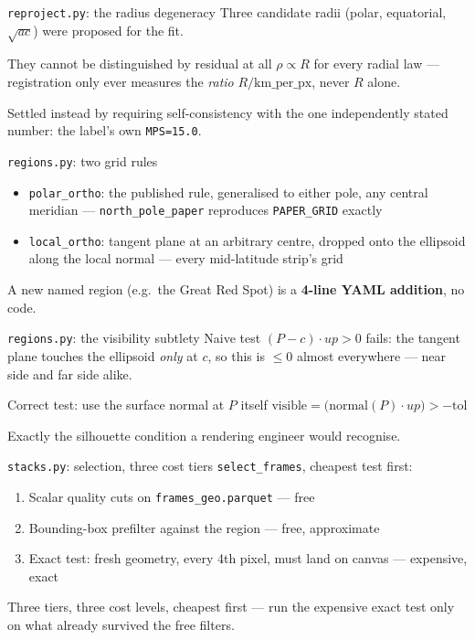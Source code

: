 \documentclass[aspectratio=169,11pt]{beamer}
\newcommand{\currevsec}{}
\newcommand{\revsec}[1]{\gdef\currevsec{#1}}
\begin{document}
\begin{frame}{\texttt{reproject.py}: the radius degeneracy}
  \revsec{4.8}
  Three candidate radii (polar, equatorial, $\sqrt{ac}$) were proposed for the fit.
  \begin{alertblock}{They cannot be distinguished by residual at all}
    $\rho \propto R$ for every radial law --- registration only ever measures the \emph{ratio} $R / \text{km\_per\_px}$, never $R$ alone.
  \end{alertblock}
  Settled instead by requiring self-consistency with the one independently stated number: the label's own \texttt{MPS=15.0}.
\end{frame}

\begin{frame}{\texttt{regions.py}: two grid rules}
  \revsec{4.9}
  \begin{itemize}
    \item \texttt{polar\_ortho}: the published rule, generalised to either pole, any central meridian --- \texttt{north\_pole\_paper} reproduces \texttt{PAPER\_GRID} exactly
    \item \texttt{local\_ortho}: tangent plane at an arbitrary centre, dropped onto the ellipsoid along the local normal --- every mid-latitude strip's grid
  \end{itemize}
  \vspace{0.2cm}
  A new named region (e.g.\ the Great Red Spot) is a \textbf{4-line YAML addition}, no code.
\end{frame}

\begin{frame}{\texttt{regions.py}: the visibility subtlety}
  \revsec{4.9}
  Naive test $(P-c)\cdot up > 0$ fails: the tangent plane touches the ellipsoid \emph{only} at $c$, so this is $\leq 0$ almost everywhere --- near side and far side alike.
  \begin{block}{Correct test: use the surface normal at $P$ itself}
    $\text{visible} = \big(\text{normal}(P)\cdot up\big) > -\text{tol}$
  \end{block}
  Exactly the silhouette condition a rendering engineer would recognise.
\end{frame}

\begin{frame}{\texttt{stacks.py}: selection, three cost tiers}
  \revsec{4.10}
  \texttt{select\_frames}, cheapest test first:
  \begin{enumerate}
    \item Scalar quality cuts on \texttt{frames\_geo.parquet} --- free
    \item Bounding-box prefilter against the region --- free, approximate
    \item Exact test: fresh geometry, every 4th pixel, must land on canvas --- expensive, exact
  \end{enumerate}
  Three tiers, three cost levels, cheapest first --- run the expensive exact test only on what already survived the free filters.
\end{frame}
\end{document}
